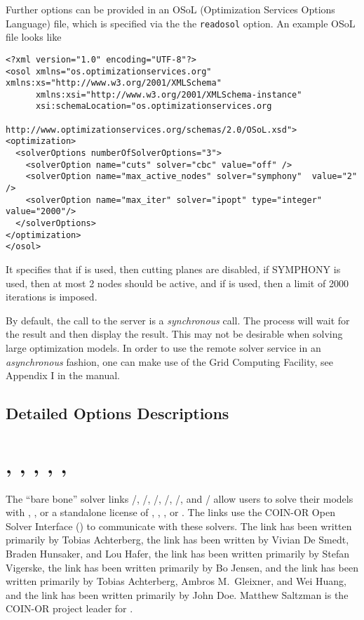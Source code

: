 Further options can be provided in an OSoL (Optimization Services Options Language) file, which is specified via the the \texttt{readosol} option.
An example OSoL file looks like
\begin{verbatim}
<?xml version="1.0" encoding="UTF-8"?>
<osol xmlns="os.optimizationservices.org" xmlns:xs="http://www.w3.org/2001/XMLSchema"
      xmlns:xsi="http://www.w3.org/2001/XMLSchema-instance"
      xsi:schemaLocation="os.optimizationservices.org
                          http://www.optimizationservices.org/schemas/2.0/OSoL.xsd">
<optimization>
  <solverOptions numberOfSolverOptions="3">
    <solverOption name="cuts" solver="cbc" value="off" />
    <solverOption name="max_active_nodes" solver="symphony"  value="2" />
    <solverOption name="max_iter" solver="ipopt" type="integer" value="2000"/>
  </solverOptions>
</optimization>
</osol>
\end{verbatim}
It specifies that if \CBC is used, then cutting planes are disabled,
if \textsc{SYMPHONY} is used, then at most 2 nodes should be active,
and if \IPOPT is used, then a limit of 2000 iterations is imposed.

By default, the call to the server is a \emph{synchronous} call.
The \GAMS process will wait for the result and then display the result.
This may not be desirable when solving large optimization models.
In order to use the remote solver service in an \emph{asynchronous} fashion, one can make use of the \GAMS Grid Computing Facility, see Appendix I in the \GAMS manual.

\subsection{Detailed Options Descriptions}



\section{\OSICPLEX, \OSIGLPK, \OSIGUROBI, \OSIMOSEK, \OSISOPLEX, \OSIXPRESS}

The ``bare bone'' solver links \GAMS/\OSICPLEX, \GAMS/\OSIGLPK, \GAMS/\OSIGUROBI, \GAMS/\OSIMOSEK, \GAMS/\OSISOPLEX, and \GAMS/\OSIXPRESS
allow users to solve their \GAMS models with \GLPK, \SOPLEX, or a standalone license of \CPLEX, \GUROBI, \MOSEK, or \XPRESS.
The links use the COIN-OR Open Solver Interface (\OSI) to communicate with these solvers.
The \OSICPLEX link has been written primarily by Tobias Achterberg,
the \OSIGLPK link has been written by Vivian De Smedt, Braden Hunsaker, and Lou Hafer,
the \OSIGUROBI link has been written primarily by Stefan Vigerske,
the \OSIMOSEK link has been written primarily by Bo Jensen, and
the \OSISOPLEX link has been written primarily by Tobias Achterberg, Ambros M.\ Gleixner, and Wei Huang, and
the \OSIXPRESS link has been written primarily by John Doe.
Matthew Saltzman is the COIN-OR project leader for \OSI.


